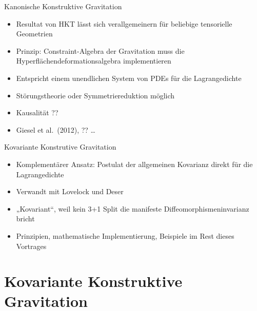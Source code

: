 \documentclass{beamer}
\begin{document}
    \begin{frame}{Kanonische Konstruktive Gravitation}
        \begin{itemize}
            \item Resultat von HKT lässt sich verallgemeinern für beliebige tensorielle Geometrien \pause
            \item Prinzip: Constraint-Algebra der Gravitation muss die
            Hyperflächendeformationsalgebra implementieren \pause
            \item Entspricht einem unendlichen System von PDEs für die Lagrangedichte \pause
            \item Störungstheorie oder Symmetriereduktion möglich \pause
            \item Kausalität ?? \pause
            \item Giesel et al.\ (2012), ?? \ldots
        \end{itemize}
    \end{frame}

    \begin{frame}{Kovariante Konstrutive Gravitation}
        \begin{itemize}
            \item Komplementärer Ansatz: Postulat der allgemeinen Kovarianz direkt für die Lagrangedichte \pause
            \item Verwandt mit Lovelock und Deser \pause
            \item „Kovariant“, weil kein 3+1 Split die manifeste Diffeomorphismeninvarianz bricht \pause
            \item Prinzipien, mathematische Implementierung, Beispiele im Rest dieses Vortrages
        \end{itemize}
    \end{frame}


    \section{Kovariante Konstruktive Gravitation}\label{sec:covariant-constructive-gravity}
\end{document}
